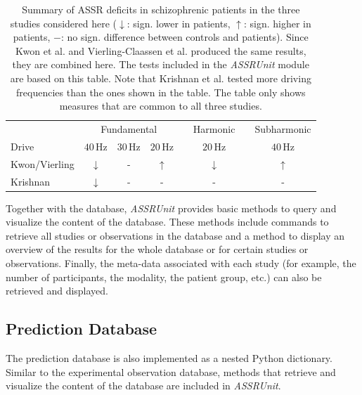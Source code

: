 \documentclass[a4paper,10pt]{article}
\begin{document}
\begin{table}[h!]
\centering
\label{Tab:Experiments} 
\caption{Summary of ASSR deficits in schizophrenic patients in the three studies considered here ($\downarrow$: sign. lower in patients, $\uparrow$: sign. higher in patients, $-$: no sign. difference between controls and patients). 
Since Kwon et al. \cite{Kwon1999} and Vierling-Claassen et al. \cite{Vierling2008}
produced the same results, they are combined here. The tests included in the \textit{ASSRUnit} module are based on this table. Note that Krishnan et al. \cite{Krishnan2009} tested more driving frequencies than the ones shown in the table. 
The table only shows measures that are common to all three studies.}
\begin{tabular}{lccccccc}\toprule
& \multicolumn{3}{c}{Fundamental}& \phantom{a} & Harmonic & \phantom{a} & Subharmonic \\
\cmidrule{2-4} \cmidrule{6-6} \cmidrule{8-8}
Drive& $40$\,Hz  & $30$\,Hz  & $20$\,Hz&  & $20$\,Hz & &$40$\,Hz \\
\midrule 
Kwon/Vierling & $\downarrow$& -& $\uparrow$& &$\downarrow$ & & $\uparrow$\\ \addlinespace

Krishnan & $\downarrow$& -& -& &- & &- \\
\bottomrule
\end{tabular}
\end{table}


Together with the database, \textit{ASSRUnit} provides basic methods to query and visualize the content of the database. These methods include commands to retrieve all studies or observations in the database and a method
to display an overview of the results for the whole database or for certain studies or observations. Finally, the meta-data associated with each study (for example, the number of participants, the modality, the patient group, etc.)
can also be retrieved and displayed.


\subsection{Prediction Database}
The prediction database is also implemented as a nested Python dictionary. Similar to the experimental observation database, methods that retrieve and visualize the content of the database are included in \textit{ASSRUnit}.
\end{document}
